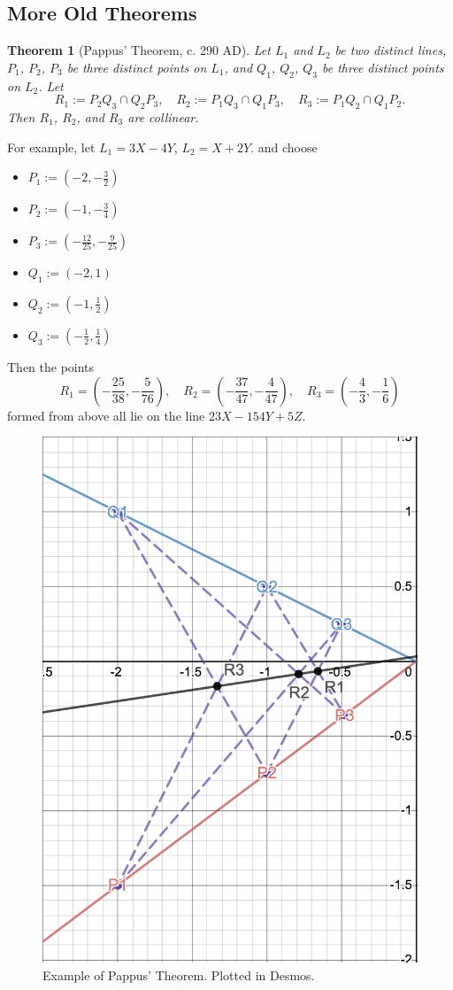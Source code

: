 \documentclass[12pt]{article}
\newtheorem{theorem}{Theorem}[section]
\theoremstyle{definition}
\begin{document}
\subsection{More Old Theorems}
\begin{theorem}[Pappus' Theorem, c. 290 AD]
    Let $L_1$ and $L_2$ be two distinct lines, $P_1$, $P_2$, $P_3$ be three distinct points on $L_1$, and $Q_1$, $Q_2$, $Q_3$ be three distinct points on $L_2$. Let
    \[R_1:=P_2Q_3\cap Q_2P_3,\quad R_2:=P_1Q_3\cap Q_1P_3,\quad R_3:=P_1Q_2\cap Q_1P_2.\]
    Then $R_1$, $R_2$, and $R_3$ are collinear.
\end{theorem}
For example, let $L_1=3X-4Y$, $L_2=X+2Y$. and choose
\begin{multicols}{2}
    \begin{itemize}
        \item $P_1:=\left(-2,-\frac{3}{2}\right)$
        \item $P_2:=\left(-1,-\frac{3}{4}\right)$
        \item $P_3:=\left(-\frac{12}{25},-\frac{9}{25}\right)$
        \item $Q_1:=(-2,1)$
        \item $Q_2:=\left(-1,\frac{1}{2}\right)$
        \item $Q_3:=\left(-\frac{1}{2},\frac{1}{4}\right)$
    \end{itemize}
\end{multicols}
Then the points
\[R_1=\left(-\frac{25}{38},-\frac{5}{76}\right),\quad R_2=\left(-\frac{37}{47},-\frac{4}{47}\right),\quad R_3=\left(-\frac{4}{3},-\frac{1}{6}\right)\]
formed from above all lie on the line $23X-154Y+5Z$.
\begin{figure}[H]
    \centering
    \includegraphics[height = 8 cm]{49.png}
    \caption{Example of Pappus' Theorem. Plotted in Desmos.}
\end{figure}
\end{document}
